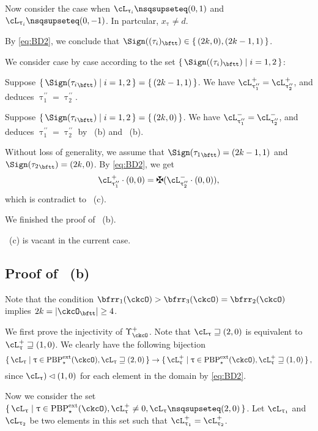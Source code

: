 \documentclass[12pt,a4paper]{amsart}
\def\abs#1{\left|{#1}\right|}
\numberwithin{equation}{section}
\theoremstyle{remark}
\def\PBPes{\mathrm{PBP}^{\mathrm{ext}}_{\star}}
\def\uptaupp{\uptau^{\prime\prime}}
\begin{document}
\smallskip

Now consider the case when $\ac_{\uptau_{i}}\nsqsupseteq (0,1)$
and $\ac_{\uptau_{i}}\nsqsupseteq (0,-1)$. In partcular, $x_{\uptau}\neq d$.

By \eqref{eq:BD2}, we conclude that $\Sign((\tau_{i})_{\bftt}) \in \set{ (2k,0),(2k-1,1)}$.

We consider case by case according to the set $\set{\Sign((\tau_{i})_{\bftt})|i=1,2}$:
  \begin{enumPF}
    \item Suppose
    $\set{\Sign({\tau_{i}}_{\bftt})|i=1,2} = \set{(2k-1,1)}$. We have
    $\pac{\uptaupp_{1}}=\pac{\uptaupp_{2}}$, and deduces
    $\uptaupp_{1}=\uptaupp_{2}$.
    \item
    Suppose $\set{\Sign({\tau_{i}}_{\bftt})|i=1,2} = \set{(2k,0)}$. We have
    $\nac{\uptaupp_{1}}=\nac{\uptaupp_{2}}$, and deduces
    $\uptaupp_{1}=\uptaupp_{2}$ by ~(b) and ~(b).
    \item
    Without loss of generality, we assume that
    $\Sign({\tau_{1}}_{\bftt}) = (2k-1,1)$ and
    $\Sign({\tau_{2}}_{\bftt}) = (2k,0)$.
    By \eqref{eq:BD2}, we get
    \[
      \pac{\uptaupp_{1}}\cdot (0,0)=\maltese(\nac{\uptaupp_{2}}\cdot (0,0)),
    \]
    which is contradict to ~(c).
  \end{enumPF}
  We finished the proof of ~(b).

  ~(c) is vacant in the current case.


\subsection*{\bf Proof of ~(b)}
Note that the condition $\bfrr_{1}(\ckcO)>\bfrr_{3}(\ckcO)=\bfrr_{2}(\ckcO)$
implies $2k = \abs{\ckcO_{\bftt}}\geq 4$.


We first prove the injectivity of $\Upsilon^{+}_{\ckcO}$.
  Note that $\ac_{\uptau}\sqsupseteq (2,0)$ is equivalent to
  $\pac{\uptau}\sqsupseteq (1,0)$.
  We clearly have the following  bijection
  \[
    \set{\ac_{\uptau}|\uptau\in \PBPes(\ckcO),\ac_{\uptau}\sqsupseteq (2,0)} \rightarrow \set{\pac{\uptau}|\uptau\in \PBPes(\ckcO),\pac{\uptau}\sqsupseteq (1,0)},
  \]
  since  $\ac_{\uptau})\lhd (1,0)$ for each element in the domain by \eqref{eq:BD2}.

  Now we consider the set
  $\set{\ac_{\uptau}|\uptau\in \PBPes(\ckcO), \pac{\uptau}\neq 0, \ac_{\uptau}\nsqsupseteq (2,0)}$. Let
  $\ac_{\uptau_{1}}$ and $\ac_{\uptau_{2}}$ be two elements in this set such that
  $\pac{\uptau_{1}}=\pac{\uptau_{2}}$.
\end{document}
